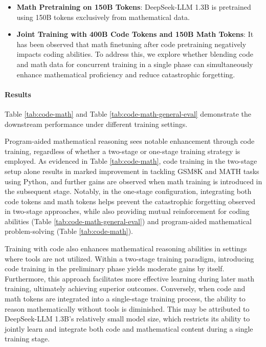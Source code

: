 \begin{itemize}[topsep=0pt]
\begin{itemize}[topsep=0pt]
\begin{itemize}[topsep=0pt]
    \item \textbf{Math Pretraining on 150B Tokens}: DeepSeek-LLM 1.3B is pretrained using 150B tokens exclusively from mathematical data.
    \item \textbf{Joint Training with 400B Code Tokens and 150B Math Tokens}: It has been observed that math finetuning after code pretraining negatively impacts coding abilities. To address this, we explore whether blending code and math data for concurrent training in a single phase can simultaneously enhance mathematical proficiency and reduce catastrophic forgetting.
\end{itemize}

\paragraph{Results}
Table \ref{tab:code-math} and Table \ref{tab:code-math-general-eval} demonstrate the downstream performance under different training settings.

Program-aided mathematical reasoning sees notable enhancement through code training, regardless of whether a two-stage or one-stage training strategy is employed. As evidenced in Table \ref{tab:code-math}, code training in the two-stage setup alone results in marked improvement in tackling GSM8K and MATH tasks using Python, and further gains are observed when math training is introduced in the subsequent stage. Notably, in the one-stage configuration, integrating both code tokens and math tokens helps prevent the catastrophic forgetting observed in two-stage approaches, while also providing mutual reinforcement for coding abilities (Table \ref{tab:code-math-general-eval}) and program-aided mathematical problem-solving (Table \ref{tab:code-math}).

Training with code also enhances mathematical reasoning abilities in settings where tools are not utilized. Within a two-stage training paradigm, introducing code training in the preliminary phase yields moderate gains by itself. Furthermore, this approach facilitates more effective learning during later math training, ultimately achieving superior outcomes. Conversely, when code and math tokens are integrated into a single-stage training process, the ability to reason mathematically without tools is diminished. This may be attributed to DeepSeek-LLM 1.3B’s relatively small model size, which restricts its ability to jointly learn and integrate both code and mathematical content during a single training stage.


\end{itemize}
\end{itemize}
